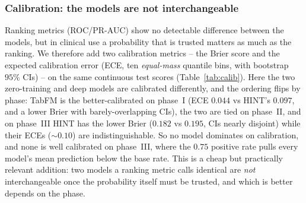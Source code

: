 \documentclass[a4paper,fleqn]{cas-sc}
\begin{document}
\subsubsection{Calibration: the models are not interchangeable}
\label{sec:calibration}
Ranking metrics (ROC/PR-AUC) show no detectable difference between the models, but in clinical
use a probability that is trusted matters as much as the ranking. We therefore add two
calibration metrics -- the Brier score and the expected calibration error (ECE, ten
\emph{equal-mass} quantile bins, with bootstrap $95\%$ CIs) -- on the same continuous test
scores (Table~\ref{tab:calib}). Here the two zero-training and deep models are calibrated
differently, and the ordering flips by phase: TabFM is the better-calibrated on phase~I (ECE
$0.044$ vs HINT's $0.097$, and a lower Brier with barely-overlapping CIs), the two are tied on
phase~II, and on phase~III HINT has the lower Brier ($0.182$ vs $0.195$, CIs nearly disjoint)
while their ECEs ($\sim0.10$) are indistinguishable. So no model dominates on calibration, and
none is well calibrated on phase~III, where the $0.75$ positive rate pulls every model's mean
prediction below the base rate. This is a cheap but practically relevant addition: two models
a ranking metric calls identical are \emph{not} interchangeable once the probability itself
must be trusted, and which is better depends on the phase.
\end{document}
